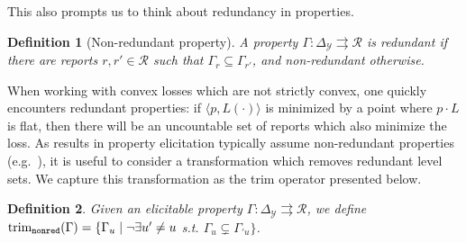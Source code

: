 \documentclass[11pt]{article}
\newcommand{\reals}{\mathbb{R}}
\newcommand{\prop}[1]{\mathrm{prop}[#1]}
\newcommand{\simplex}{\Delta_\Y}
\newcommand{\R}{\mathcal{R}}
\newcommand{\U}{\mathcal{U}}
\newcommand{\Y}{\mathcal{Y}}
\newcommand{\inprod}[2]{\langle #1, #2 \rangle}%
\newcommand{\toto}{\rightrightarrows}
\newcommand{\trimnonred}{\mathrm{trim}_{{\tt nonred}}}
\newcommand{\trimcover}{\mathrm{trim}_{\tt cover}}
\newtheorem{definition}{Definition}
\begin{document}
This also prompts us to think about redundancy in properties.
\begin{definition}[Non-redundant property]\label{def:nonredundant-prop}
	A property $\Gamma:\simplex \toto \R$ is \emph{redundant} if there are reports $r, r' \in \R$ such that $\Gamma_r \subseteq \Gamma_{r'}$, and \emph{non-redundant} otherwise.
\end{definition}




When working with convex losses which are not strictly convex, one quickly encounters redundant properties: if $\inprod{p}{L(\cdot)}$ is minimized by a point where $p\cdot L$ is flat, then there will be an uncountable set of reports which also minimize the loss.
As results in property elicitation typically assume non-redundant properties (e.g.~\cite{frongillo2014general,frongillo2015elicitation}), it is useful to consider a transformation which removes redundant level sets.
We capture this transformation as the trim operator presented below.

\begin{definition}\label{def:trim-prop-nonred}
  Given an elicitable property $\Gamma:\simplex \toto\R$, we define $\trimnonred(\Gamma) = \{\Gamma_u \mid \neg \exists u' \neq u$ s.t. $\Gamma_u \subsetneq \Gamma_{'u}\}$.
\end{definition}
\end{document}
